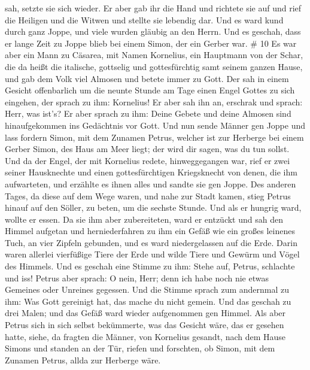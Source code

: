 sah, setzte sie sich wieder.  Er aber gab ihr die Hand und
richtete sie auf und rief die Heiligen und die Witwen und stellte sie
lebendig dar.  Und es ward kund durch ganz Joppe, und viele
wurden gläubig an den Herrn.  Und es geschah, dass er lange
Zeit zu Joppe blieb bei einem Simon, der ein Gerber war. \# 10
 Es war aber ein Mann zu Cäsarea, mit Namen Kornelius, ein
Hauptmann von der Schar, die da heißt die italische, 
gottselig und gottesfürchtig samt seinem ganzen Hause, und gab dem Volk
viel Almosen und betete immer zu Gott.  Der sah in einem
Gesicht offenbarlich um die neunte Stunde am Tage einen Engel Gottes zu
sich eingehen, der sprach zu ihm: Kornelius!  Er aber sah
ihn an, erschrak und sprach: Herr, was ist's? Er aber sprach zu ihm:
Deine Gebete und deine Almosen sind hinaufgekommen ins Gedächtnis vor
Gott.  Und nun sende Männer gen Joppe und lass fordern
Simon, mit dem Zunamen Petrus,  welcher ist zur Herberge bei
einem Gerber Simon, des Haus am Meer liegt; der wird dir sagen, was du
tun sollst.  Und da der Engel, der mit Kornelius redete,
hinweggegangen war, rief er zwei seiner Hausknechte und einen
gottesfürchtigen Kriegsknecht von denen, die ihm aufwarteten,
 und erzählte es ihnen alles und sandte sie gen Joppe.
 Des anderen Tages, da diese auf dem Wege waren, und nahe
zur Stadt kamen, stieg Petrus hinauf auf den Söller, zu beten, um die
sechste Stunde.  Und als er hungrig ward, wollte er essen.
Da sie ihm aber zubereiteten, ward er entzückt  und sah den
Himmel aufgetan und herniederfahren zu ihm ein Gefäß wie ein großes
leinenes Tuch, an vier Zipfeln gebunden, und es ward niedergelassen auf
die Erde.  Darin waren allerlei vierfüßige Tiere der Erde
und wilde Tiere und Gewürm und Vögel des Himmels.  Und es
geschah eine Stimme zu ihm: Stehe auf, Petrus, schlachte und iss!
 Petrus aber sprach: O nein, Herr; denn ich habe noch nie
etwas Gemeines oder Unreines gegessen.  Und die Stimme
sprach zum andernmal zu ihm: Was Gott gereinigt hat, das mache du nicht
gemein.  Und das geschah zu drei Malen; und das Gefäß ward
wieder aufgenommen gen Himmel.  Als aber Petrus sich in
sich selbst bekümmerte, was das Gesicht wäre, das er gesehen hatte,
siehe, da fragten die Männer, von Kornelius gesandt, nach dem Hause
Simons und standen an der Tür,  riefen und forschten, ob
Simon, mit dem Zunamen Petrus, allda zur Herberge wäre. 
